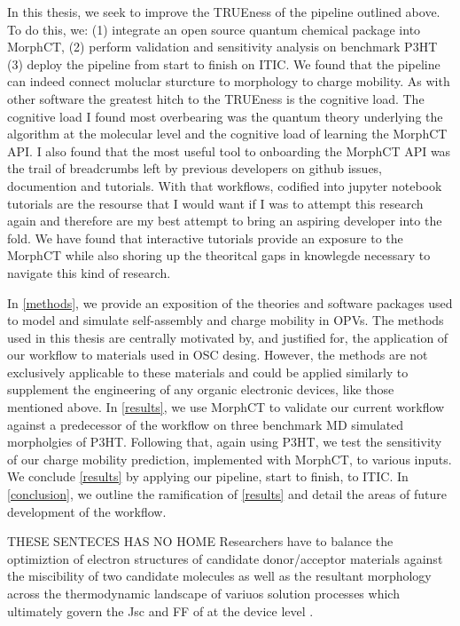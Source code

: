 In this thesis, we seek to improve the TRUEness of the pipeline outlined above.
To do this, we: (1) integrate an open source quantum chemical package into MorphCT,
(2) perform validation and sensitivity analysis on benchmark P3HT
(3) deploy the pipeline from start to finish on ITIC. 
We found that the pipeline can indeed connect moluclar sturcture to morphology to charge
mobility. As with other software the greatest hitch to the TRUEness is the
cognitive load. The cognitive load I found most overbearing was the quantum theory underlying the algorithm 
at the molecular level and the cognitive load of learning the MorphCT API. 
I also found that the most useful tool to onboarding the MorphCT API was the
trail of breadcrumbs left by previous developers on github issues, documention and tutorials. 
With that workflows, codified into jupyter notebook tutorials are the resourse that I would want if I was to
attempt this research again and therefore are my best attempt to bring an aspiring developer into the fold.
We have found that interactive tutorials provide an exposure to the MorphCT while also shoring up the
theoritcal gaps in knowlegde necessary to navigate this kind of research. 

In \autoref{methods}, we
provide an exposition of the theories and software packages used to model and simulate self-assembly and charge mobility in
OPVs.
The methods used in this thesis are centrally motivated by, and justified for, 
the application of our workflow to materials
used in OSC desing. However, the methods are
not exclusively applicable to these materials and could be applied similarly to supplement the engineering of any organic
electronic devices, like those mentioned above. 
In \autoref{results}, we use MorphCT to validate our current workflow against a predecessor of the 
workflow on three benchmark MD simulated morpholgies of P3HT. 
Following that, again using P3HT, we test the sensitivity of our charge mobility prediction, 
implemented with MorphCT, to various inputs. We conclude \autoref{results} by applying our pipeline,
start to finish, to ITIC. 
In \autoref{conclusion}, we outline the ramification of \autoref{results} and detail the areas of future development of the workflow. 

THESE SENTECES HAS NO HOME Researchers have to
balance the optimiztion of electron structures of candidate donor/acceptor materials against the miscibility
of two candidate molecules as well as the resultant morphology across the thermodynamic landscape of
variuos solution processes which ultimately govern the Jsc and FF of at the device level \cite{Zhu2020a}. 

